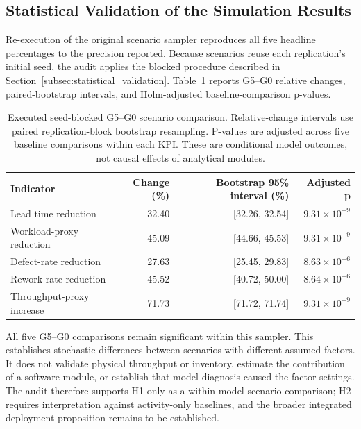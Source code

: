 \subsection{Statistical Validation of the Simulation Results}
\label{subsec:statistical_results}

Re-execution of the original scenario sampler reproduces all five headline percentages to the precision reported. Because scenarios reuse each replication's initial seed, the audit applies the blocked procedure described in Section~\ref{subsec:statistical_validation}. Table~\ref{tab:paired_statistics} reports G5--G0 relative changes, paired-bootstrap intervals, and Holm-adjusted baseline-comparison p-values.

\begin{table}[t]
\caption{Executed seed-blocked G5--G0 scenario comparison. Relative-change intervals use paired replication-block bootstrap resampling. P-values are adjusted across five baseline comparisons within each KPI. These are conditional model outcomes, not causal effects of analytical modules.}
\label{tab:paired_statistics}
\centering\small
\begin{tabular}{lrrr}
\toprule
Indicator & Change (\%) & Bootstrap 95\% interval (\%) & Adjusted p\\
\midrule
Lead time reduction & 32.40 & [32.26, 32.54] & $ 9.31 \times 10^{-9} $ \\
Workload-proxy reduction & 45.09 & [44.66, 45.53] & $ 9.31 \times 10^{-9} $ \\
Defect-rate reduction & 27.63 & [25.45, 29.83] & $ 8.63 \times 10^{-6} $ \\
Rework-rate reduction & 45.52 & [40.72, 50.00] & $ 8.64 \times 10^{-6} $ \\
Throughput-proxy increase & 71.73 & [71.72, 71.74] & $ 9.31 \times 10^{-9} $ \\
\bottomrule
\end{tabular}
\end{table}

All five G5--G0 comparisons remain significant within this sampler. This establishes stochastic differences between scenarios with different assumed factors. It does not validate physical throughput or inventory, estimate the contribution of a software module, or establish that model diagnosis caused the factor settings. The audit therefore supports H1 only as a within-model scenario comparison; H2 requires interpretation against activity-only baselines, and the broader integrated deployment proposition remains to be established.

